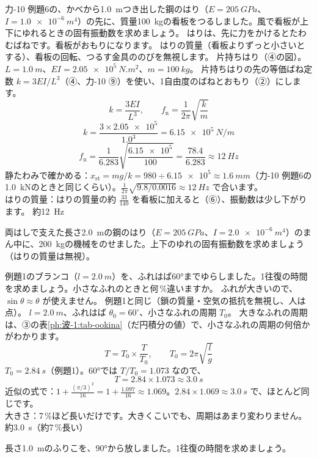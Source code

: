 \label{ph:波-1:ex7}
\begin{phreidai}[看板をつるしたはりのゆれ]
力-10 例題6の、かべから\qty{1.0}{m}つき出した鋼のはり（$E=\qty{205}{GPa}$、$I=\qty{1.0e-6}{m^4}$）の先に、質量\qty{100}{kg}の看板をつるしました。風で看板が上下にゆれるときの固有振動数を求めましょう。
\phbamen
はりは、先に力をかけるとたわむばねです。看板がおもりになります。
\phmushi
はりの質量（看板よりずっと小さいとする）、看板の回転、つるす金具ののびを無視します。
\phzu
片持ちはり（④の図）。$L=\qty{1.0}{m}$、$EI=\qty{2.05e5}{N.m^2}$、$m=\qty{100}{kg}$。
\phriyu
片持ちはりの先の等価ばね定数 $k=3EI/L^3$（④、力-10 ⑨）を使い、1自由度のばねとおもり（②）にします。
\phtateru
\[k=\frac{3EI}{L^3},\qquad f_{\mathrm n}=\frac{1}{2\pi}\sqrt{\frac{k}{m}}\]
\phtoku
\[k=\frac{3\times\num{2.05e5}}{1.0^3}=\qty{6.15e5}{N/m}\]
\[f_{\mathrm n}=\frac{1}{6.283}\sqrt{\frac{\num{6.15e5}}{100}}=\frac{78.4}{6.283}\approx\qty{12}{Hz}\]
\phtashikame
静たわみで確かめる：$x_{\mathrm{st}}=mg/k=980\div\num{6.15e5}\approx\qty{1.6}{mm}$（力-10 例題6の\qty{1.0}{kN}のときと同じくらい）。$\tfrac{1}{2\pi}\sqrt{9.8/0.0016}\approx\qty{12}{Hz}$ で合います。\\
はりの質量：はりの質量の約 $\tfrac{33}{140}$ を看板に加えると（⑥）、振動数は少し下がります。
\kotae 約\qty{12}{Hz}
\end{phreidai}
\begin{jibun}
両はしで支えた長さ\qty{2.0}{m}の鋼のはり（$E=\qty{205}{GPa}$、$I=\qty{2.0e-6}{m^4}$）のまん中に、\qty{200}{kg}の機械をのせました。上下のゆれの固有振動数を求めましょう（はりの質量は無視）。
\end{jibun}

\label{ph:波-1:ex8}
\begin{phreidai}[ブランコを大きくこぐと]
例題1のブランコ（$l=\qty{2.0}{m}$）を、ふれはば60°までゆらしました。1往復の時間を求めましょう。小さなふれのときと何\,\%違いますか。
\phbamen
ふれが大きいので、$\sin\theta\approx\theta$ が使えません。
\phmushi
例題1と同じ（鎖の質量・空気の抵抗を無視し、人は点）。
\phzu
$l=\qty{2.0}{m}$、ふれはば $\theta_0=60^\circ$、小さなふれの周期 $T_0$。
\phriyu
大きなふれの周期は、③の表\ref{ph:波-1:tab-ookina}（だ円積分の値）で、小さなふれの周期の何倍かがわかります。
\phtateru
\[T=T_0\times\frac{T}{T_0},\qquad T_0=2\pi\sqrt{\frac{l}{g}}\]
\phtoku
$T_0=\qty{2.84}{s}$（例題1）。60°では $T/T_0=1.073$ なので、
\[T=2.84\times1.073\approx\qty{3.0}{s}\]
\phtashikame
近似の式で：$1+\tfrac{(\pi/3)^2}{16}=1+\tfrac{1.097}{16}\approx1.069$。$2.84\times1.069\approx\qty{3.0}{s}$ で、ほとんど同じです。\\
大きさ：7\,\%ほど長いだけです。大きくこいでも、周期はあまり変わりません。
\kotae 約\qty{3.0}{s}（約7\,\%長い）
\end{phreidai}
\begin{jibun}
長さ\qty{1.0}{m}のふりこを、90°から放しました。1往復の時間を求めましょう。
\end{jibun}

